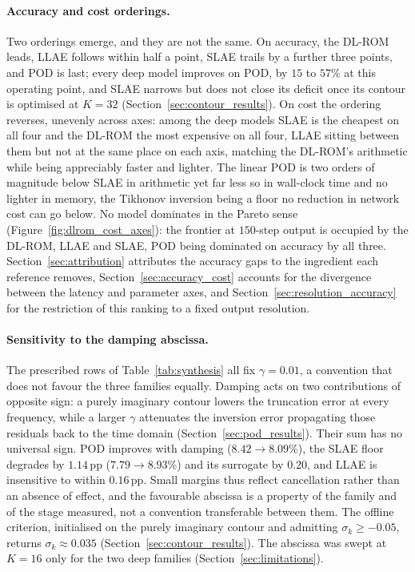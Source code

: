 ﻿\documentclass[a4paper,12pt]{article}
\theoremstyle{definition}
\theoremstyle{remark}
\begin{document}
\paragraph{Accuracy and cost orderings.}
Two orderings emerge, and they are not the same. On accuracy, the DL-ROM leads, LLAE follows within half a point, SLAE trails by a further three points, and POD is last; every deep model improves on POD, by $15$ to $57$\% at this operating point, and SLAE narrows but does not close its deficit once its contour is optimised at $K = 32$ (Section~\ref{sec:contour_results}). On cost the ordering reverses, unevenly across axes: among the deep models SLAE is the cheapest on all four and the DL-ROM the most expensive on all four, LLAE sitting between them but not at the same place on each axis, matching the DL-ROM's arithmetic while being appreciably faster and lighter. The linear POD is two orders of magnitude below SLAE in arithmetic yet far less so in wall-clock time and no lighter in memory, the Tikhonov inversion being a floor no reduction in network cost can go below. No model dominates in the Pareto sense (Figure~\ref{fig:dlrom_cost_axes}): the frontier at $150$-step output is occupied by the DL-ROM, LLAE and SLAE, POD being dominated on accuracy by all three. Section~\ref{sec:attribution} attributes the accuracy gaps to the ingredient each reference removes, Section~\ref{sec:accuracy_cost} accounts for the divergence between the latency and parameter axes, and Section~\ref{sec:resolution_accuracy} for the restriction of this ranking to a fixed output resolution.

\paragraph{Sensitivity to the damping abscissa.}
The prescribed rows of Table~\ref{tab:synthesis} all fix $\gamma = 0.01$, a convention that does not favour the three families equally. Damping acts on two contributions of opposite sign: a purely imaginary contour lowers the truncation error at every frequency, while a larger $\gamma$ attenuates the inversion error propagating those residuals back to the time domain (Section~\ref{sec:pod_results}). Their sum has no universal sign. POD improves with damping ($8.42 \to 8.09$\%), the SLAE floor degrades by $1.14$\,pp ($7.79 \to 8.93$\%) and its surrogate by $0.20$, and LLAE is insensitive to within $0.16$\,pp. Small margins thus reflect cancellation rather than an absence of effect, and the favourable abscissa is a property of the family and of the stage measured, not a convention transferable between them. The offline criterion, initialised on the purely imaginary contour and admitting $\sigma_k \ge -0.05$, returns $\sigma_k \approx 0.035$ (Section~\ref{sec:contour_results}). The abscissa was swept at $K = 16$ only for the two deep families (Section~\ref{sec:limitations}).
\end{document}
